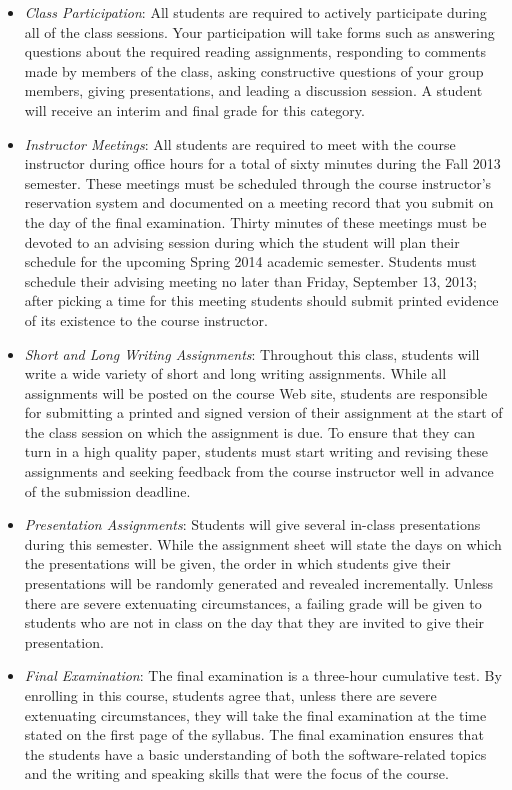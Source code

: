 \vspace*{-.05in}
\begin{itemize}

	\itemsep0em
	\item {\em Class Participation}: All students are required to actively participate during
		all of the class sessions. Your participation will take forms such as answering questions about the required
		reading assignments, responding to comments made by members of the class, asking constructive questions of your 
		group members, giving presentations, and leading a discussion session. A student will receive an interim and
		final grade for this category.

	\item {\em Instructor Meetings}: All students are required to meet with the course instructor during office
		hours for a total of sixty minutes during the Fall 2013 semester.  These meetings must be scheduled through the
		course instructor's reservation system and documented on a meeting record that you submit on the day of the final
		examination.  Thirty minutes of these meetings must be devoted to an advising session during which the student
		will plan their schedule for the upcoming Spring 2014 academic semester.  Students must schedule their advising
		meeting no later than Friday, September 13, 2013; after picking a time for this meeting students should submit
		printed evidence of its existence to the course instructor.

	\item {\em Short and Long Writing Assignments}: Throughout this class, students will write a wide variety of short
		and long writing assignments.  While all assignments will be posted on the course Web site, students are
		responsible for submitting a printed and signed version of their assignment at the start of the class session on
		which the assignment is due.  To ensure that they can turn in a high quality paper, students must start writing
		and revising these assignments and seeking feedback from the course instructor well in advance of the submission
		deadline.

	\item {\em Presentation Assignments}: Students will give several in-class presentations during this semester. While
		the assignment sheet will state the days on which the presentations will be given, the order in which students
		give their presentations will be randomly generated and revealed incrementally.  Unless there are severe
		extenuating circumstances, a failing grade will be given to students who are not in class on the day that they
		are invited to give their presentation.

	\item {\em Final Examination}: The final examination is a three-hour cumulative test.  By enrolling in this course,
		students agree that, unless there are severe extenuating circumstances, they will take the final examination at the
		time stated on the first page of the syllabus.  The final examination ensures that the students have a basic
		understanding of both the software-related topics and the writing and speaking skills that were the focus of the
		course.
	
\end{itemize}
